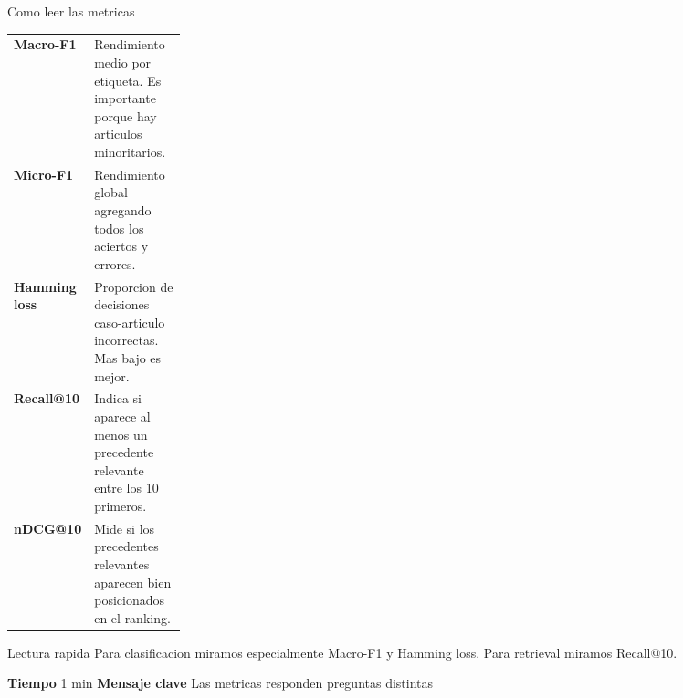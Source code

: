 \documentclass[aspectratio=169,10pt]{beamer}
\newcommand{\slidemeta}[2]{
  \vfill
  {\scriptsize\color{Muted}\textbf{Tiempo} #1 \hfill \textbf{Mensaje clave} #2}
}
\begin{document}
\begin{frame}{Como leer las metricas}
  \small
  \begin{tabularx}{\linewidth}{>{\bfseries}p{0.22\linewidth}X}
    \toprule
    Macro-F1 & Rendimiento medio por etiqueta. Es importante porque hay articulos minoritarios.\\
    Micro-F1 & Rendimiento global agregando todos los aciertos y errores.\\
    Hamming loss & Proporcion de decisiones caso-articulo incorrectas. Mas bajo es mejor.\\
    Recall@10 & Indica si aparece al menos un precedente relevante entre los 10 primeros.\\
    nDCG@10 & Mide si los precedentes relevantes aparecen bien posicionados en el ranking.\\
    \bottomrule
  \end{tabularx}
  \vspace{0.25cm}
  \begin{block}{Lectura rapida}
    Para clasificacion miramos especialmente Macro-F1 y Hamming loss. Para retrieval miramos Recall@10.
  \end{block}
  \slidemeta{1 min}{Las metricas responden preguntas distintas}
\end{frame}
\end{document}
